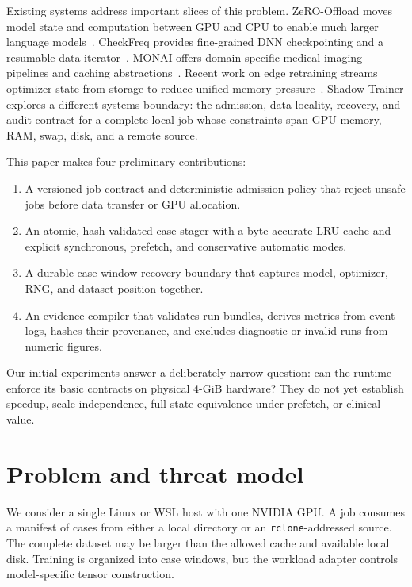 \documentclass[10pt,twocolumn]{article}
\begin{document}
Existing systems address important slices of this problem. ZeRO-Offload moves
model state and computation between GPU and CPU to enable much larger language
models~\cite{zerooffload}. CheckFreq provides fine-grained DNN checkpointing
and a resumable data iterator~\cite{checkfreq}. MONAI offers domain-specific
medical-imaging pipelines and caching abstractions~\cite{monai}. Recent work on
edge retraining streams optimizer state from storage to reduce unified-memory
pressure~\cite{steer}. Shadow Trainer explores a different systems boundary:
the admission, data-locality, recovery, and audit contract for a complete local
job whose constraints span GPU memory, RAM, swap, disk, and a remote source.

This paper makes four preliminary contributions:

\begin{enumerate}
  \item A versioned job contract and deterministic admission policy that reject
  unsafe jobs before data transfer or GPU allocation.
  \item An atomic, hash-validated case stager with a byte-accurate LRU cache and
  explicit synchronous, prefetch, and conservative automatic modes.
  \item A durable case-window recovery boundary that captures model, optimizer,
  RNG, and dataset position together.
  \item An evidence compiler that validates run bundles, derives metrics from
  event logs, hashes their provenance, and excludes diagnostic or invalid runs
  from numeric figures.
\end{enumerate}

Our initial experiments answer a deliberately narrow question: can the runtime
enforce its basic contracts on physical 4-GiB hardware? They do not yet
establish speedup, scale independence, full-state equivalence under prefetch,
or clinical value.

\section{Problem and threat model}

We consider a single Linux or WSL host with one NVIDIA GPU. A job consumes a
manifest of cases from either a local directory or an \texttt{rclone}-addressed
source. The complete dataset may be larger than the allowed cache and available
local disk. Training is organized into case windows, but the workload adapter
controls model-specific tensor construction.
\end{document}

